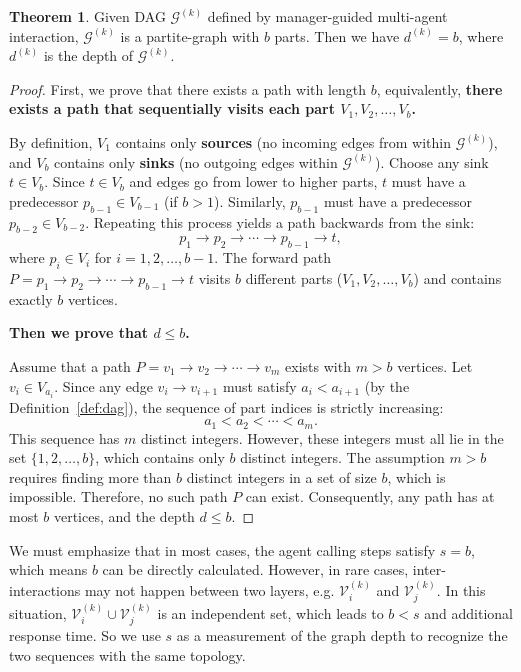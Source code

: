 \documentclass{article}
\theoremstyle{definition}
\newtheorem{theorem}{Theorem}
\begin{document}
\begin{theorem}
\label{thm-1}
    Given DAG $\mathcal{G}^{(k)}$ defined by manager-guided multi-agent interaction, $\mathcal{G}^{(k)}$ is a partite-graph with $b$ parts. Then we have $d^{(k)} = b$, where $d^{(k)}$ is the depth of $\mathcal{G}^{(k)}$.
\end{theorem}
\begin{proof}
     First, we prove that there exists a path with length $b$, equivalently, \textbf{there exists a path that sequentially visits each part $V_1, V_2, \ldots, V_b$.}
    
    By definition, $V_1$ contains only \textbf{sources} (no incoming edges from within $\mathcal{G}^{(k)}$), and $V_b$ contains only \textbf{sinks} (no outgoing edges within $\mathcal{G}^{(k)}$). Choose any sink $t \in V_b$. Since $t \in V_b$ and edges go from lower to higher parts, $t$ must have a predecessor $p_{b-1} \in V_{b-1}$ (if $b>1$). Similarly, $p_{b-1}$ must have a predecessor $p_{b-2} \in V_{b-2}$. Repeating this process yields a path backwards from the sink:
    \[p_1 \rightarrow p_2 \rightarrow \cdots \rightarrow p_{b-1} \rightarrow t,\]
    where $p_i \in V_i$ for $i = 1, 2, \ldots, b-1$. The forward path $P = p_1 \rightarrow p_2 \rightarrow \cdots \rightarrow p_{b-1} \rightarrow t$ visits $b$ different parts ($V_1, V_2, \ldots, V_b$) and contains exactly $b$ vertices.

    \textbf{Then we prove that $d \leq b$.}

    Assume that a path $P = v_1 \rightarrow v_2 \rightarrow \cdots \rightarrow v_m$ exists with $m > b$ vertices. Let $v_i \in V_{a_i}$. Since any edge $v_i \rightarrow v_{i+1}$ must satisfy $a_i < a_{i+1}$ (by the Definition~\ref{def:dag}), the sequence of part indices is strictly increasing:
    \[a_1 < a_2 < \cdots < a_m.\]
    This sequence has $m$ distinct integers. However, these integers must all lie in the set $\{1, 2, \ldots, b\}$, which contains only $b$ distinct integers. The assumption $m > b$ requires finding more than $b$ distinct integers in a set of size $b$, which is impossible. Therefore, no such path $P$ can exist. Consequently, any path has at most $b$ vertices, and the depth $d \leq b$.
\end{proof}
We must emphasize that in most cases, the agent calling steps satisfy $s = b$, which means $b$ can be directly calculated. However, in rare cases, inter-interactions may not happen between two layers, e.g. $\mathcal{V}^{(k)}_i$ and $\mathcal{V}^{(k)}_j$. In this situation, $\mathcal{V}^{(k)}_i \cup \mathcal{V}^{(k)}_j$ is an independent set, which leads to $b < s$ and additional response time. So we use $s$ as a measurement of the graph depth to recognize the two sequences with the same topology.
\end{document}
